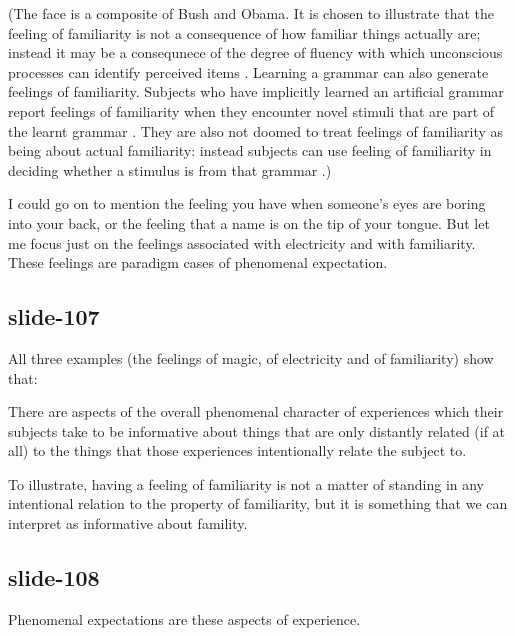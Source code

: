 \documentclass[12pt,\papersize]{extarticle}
\begin{document}
(The face is a composite of Bush and Obama.  It is chosen to illustrate that
the feeling of familiarity is not a consequence of how familiar things
actually are; instead it may be a consequnece of
the degree of fluency with which unconscious processes can identify
perceived items \citep{Whittlesea:1993xk,Whittlesea:1998qj}.
Learning a grammar can also generate feelings of familiarity.
Subjects who have implicitly learned an artificial grammar report feelings
of familiarity when they encounter novel stimuli that are part of
the learnt grammar \citep{scott:2008_familiarity}.
They are also not doomed to treat feelings of familiarity as being
about actual familiarity:
instead subjects can use feeling of
familiarity in deciding whether a stimulus is from that grammar
\citep{Wan:2008_familiarity}.)

I could go on to mention the feeling you have when someone’s eyes are
boring into your back, or the feeling that a name is on the tip of your
tongue.
But let me focus just on the feelings associated with electricity and
with familiarity.
These feelings are paradigm cases of phenomenal expectation.

\subsection{slide-107}
All three examples (the feelings of magic, of electricity and of
familiarity) show that:

There are aspects of the overall phenomenal character of experiences which their subjects take to be informative about things that are only distantly related (if at all) to the things that those experiences intentionally relate the subject to.

To illustrate, having a feeling of familiarity is not a matter of standing
in any
intentional relation to the property of familiarity, but it is something
that we can interpret as informative about famility.

\subsection{slide-108}
Phenomenal expectations are these aspects of experience.
\end{document}
